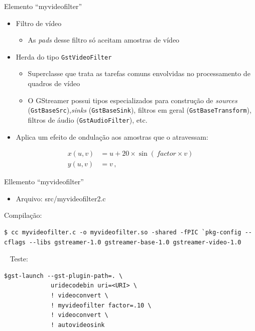 \documentclass{beamer}
\let\C\lstinline
\def\en#1{\foreignlanguage{english}{\emph{#1}}}
\begin{document}
\begin{frame}[fragile]{Elemento ``myvideofilter''}
  \begin{itemize}
    \item Filtro de vídeo
      \begin{itemize}
        \item As \en{pads} desse filtro só aceitam amostras de vídeo
      \end{itemize}
    \item Herda do tipo \C{GstVideoFilter}
      \begin{itemize}
        \item Superclasse que trata as tarefas comuns envolvidas
          no processamento de quadros de vídeo
        \item O GStreamer possui tipos especializados para construção de 
          \en{sources} (\C{GstBaseSrc}),\en{sinks} (\C{GstBaseSink}), 
          filtros em geral (\C{GstBase}\-\C{Transform}), 
          filtros de áudio (\C{GstAudioFilter}), etc.
      \end{itemize}
    \item Aplica um efeito de ondulação aos amostras que o atravessam:
  \end{itemize}
  \begin{align*}
    x(u,v)&=u+20\times\sin(\,\mathit{factor}\times{v})\\
    y(u,v)&=v\,,
  \end{align*}
\end{frame}

\begin{frame}[fragile]{Ellemento ``myvideofilter''}
  \begin{itemize}
    \item Arquivo: src/myvideofilter2.c
  \end{itemize}

  Compilação:
\begin{lstlisting}[style=command, breaklines=true]
$ cc myvideofilter.c -o myvideofilter.so -shared -fPIC `pkg-config --cflags --libs gstreamer-1.0 gstreamer-base-1.0 gstreamer-video-1.0
\end{lstlisting}

  ~
  Teste:
\begin{lstlisting}[style=command]
$gst-launch --gst-plugin-path=. \
             uridecodebin uri=<URI> \
             ! videoconvert \
             ! myvideofilter factor=.10 \
             ! videoconvert \
             ! autovideosink
\end{lstlisting}
\end{frame}
\end{document}
